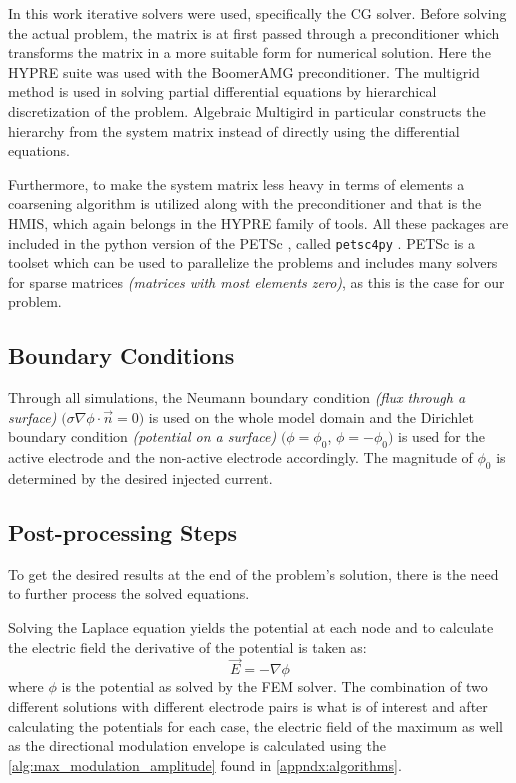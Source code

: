 In this work iterative solvers were used, specifically the \gls{CG} solver. Before solving the actual problem, the matrix is at first passed through a preconditioner which transforms the matrix in a more suitable form for numerical solution. Here the \gls{HYPRE} \cite{hypre-web-page} suite was used with the Boomer\gls{AMG} \cite[chapter 4]{McCormick1987_amg} preconditioner. The multigrid method is used in solving partial differential equations by hierarchical discretization of the problem. Algebraic Multigird in particular constructs the hierarchy from the system matrix instead of directly using the differential equations. 

Furthermore, to make the system matrix less heavy in terms of elements a coarsening algorithm is utilized along with the preconditioner and that is the \gls{HMIS}, which again belongs in the \gls{HYPRE} family of tools. All these packages are included in the python version of the \gls{PETSc} \cite{petsc-web-page,petsc-user-ref,petsc-efficient}, called \texttt{petsc4py} \cite{Dalcin2011}. \gls{PETSc} is a toolset which can be used to parallelize the problems and includes many solvers for sparse matrices \textit{(matrices with most elements zero)}, as this is the case for our problem.

\subsection{Boundary Conditions}
\label{subsec:solver_boundary_conditions}

Through all simulations, the Neumann boundary condition \textit{(flux through a surface)} $\big(\sigma\nabla\phi\cdot\vec{n} = 0\big)$ is used on the whole model domain and the Dirichlet boundary condition \textit{(potential on a surface)} $\big(\phi = \phi_0$, $\phi = -\phi_0\big)$ is used for the active electrode and the non-active electrode accordingly. The magnitude of $\phi_0$ is determined by the desired injected current.

\subsection{Post-processing Steps}

To get the desired results at the end of the problem's solution, there is the need to further process the solved equations.

Solving the Laplace equation yields the potential at each node and to calculate the electric field the derivative of the potential is taken as:
\begin{equation}
	\vec{E} = -\nabla\phi
\end{equation}
where $\phi$ is the potential as solved by the \gls{FEM} solver. The combination of two different solutions with different electrode pairs is what is of interest and after calculating the potentials for each case, the electric field of the maximum as well as the directional modulation envelope is calculated using the \autoref{alg:max_modulation_amplitude} found in \autoref{appndx:algorithms}.
